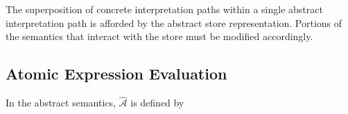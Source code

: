 





\newcommand{\aaa}[0]{\ensuremath{\hat{a}}}
\newcommand{\av}[0]{\ensuremath{\hat{v}}}
\newcommand{\af}[0]{\ensuremath{\hat{f}}}
\newcommand{\an}[0]{\ensuremath{\hat{n}}}
\newcommand{\aw}[0]{\ensuremath{\hat{w}}}
\newcommand{\arho}[0]{\ensuremath{\hat{\rho}}}
\newcommand{\asigma}[0]{\ensuremath{\hat{\sigma}}}

The superposition of concrete interpretation paths within a single abstract interpretation path is afforded by the abstract store representation.
Portions of the semantics that interact with the store must be modified accordingly.

\subsection{Atomic Expression Evaluation}

\newcommand{\Aaval}[1]{\ensuremath{\hat{\mathcal{A}}(\asigma,\arho,#1)}}

In the abstract semantics, $\hat{\mathcal{A}}$ is defined by

